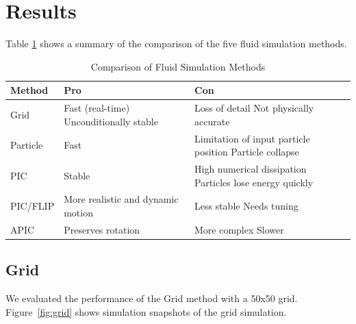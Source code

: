 \section{Results}

Table \ref{tab:fluid_comparison} shows a summary of the comparison of the five fluid simulation methods.

\begin{table}[!htbp]
\centering
\caption{Comparison of Fluid Simulation Methods}
\label{tab:fluid_comparison}
\begin{tabularx}{\columnwidth}{l X X}
\toprule
\textbf{Method} & \textbf{Pro} & \textbf{Con} \\
\midrule
Grid&
Fast (real-time) \newline
Unconditionally stable &
Loss of detail \newline
Not physically accurate \\
\midrule
Particle&
Fast &
Limitation of input particle position \newline
Particle collapse \\
\midrule
PIC&
Stable &
High numerical dissipation \newline
Particles lose energy quickly \\
\midrule
PIC/FLIP &
More realistic and dynamic motion &
Less stable \newline
Needs tuning \\
\midrule
APIC &
Preserves rotation &
More complex \newline
Slower \\
\bottomrule
\end{tabularx}
\end{table}

\subsection{Grid}

We evaluated the performance of the Grid method with a 50x50 grid. Figure~\ref{fig:grid} shows simulation snapshots of the grid simulation.

